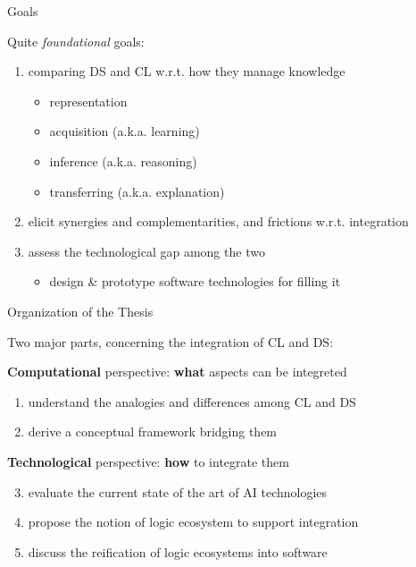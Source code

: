 \documentclass[presentation]{beamer}\mode<presentation>{\usetheme{AMSBolognaFC}}
\begin{document}
\begin{frame}{Goals}

    Quite \emph{foundational} goals:
    \vfill
    \begin{enumerate}
        \item \alert{comparing} DS and CL w.r.t. how they manage \alert{knowledge}
        \begin{itemize}
            \item \alert{representation}
            \item acquisition (a.k.a. \alert{learning})
            \item inference (a.k.a. \alert{reasoning})
            \item transferring (a.k.a. \alert{explanation})
        \end{itemize}
        
        \vfill

        \item \alert{elicit} synergies and complementarities, and frictions w.r.t. \alert{integration}

        \vfill

        \item assess the \alert{technological gap} among the two
        \begin{itemize}
            \item design \& \alert{prototype software} technologies for filling it
        \end{itemize}
    \end{enumerate}
\end{frame}

\begin{frame}{Organization of the Thesis}

    Two major parts, concerning the integration of CL and DS:
    \vfill
    \begin{block}{\textbf{Computational} perspective: \textbf{what} aspects can be integreted}
        \begin{enumerate}
            \item understand the \alert{analogies} and \alert{differences} among CL and DS
            \item derive a \alert{conceptual framework} bridging them
        \end{enumerate}
    \end{block}
    \vfill
    \begin{block}{\textbf{Technological} perspective: \textbf{how} to integrate them}
        \begin{enumerate}\setcounter{enumi}{2}
            \item evaluate the current \alert{state of the art} of AI \alert{technologies}
            \item propose the notion of \alert{logic ecosystem} to support integration
            \item discuss the \alert{reification} of logic ecosystems into \alert{software}
        \end{enumerate}
    \end{block}

\end{frame}
\end{document}
